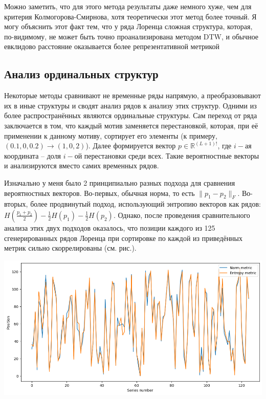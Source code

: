 \documentclass[a4paper, 12pt]{extarticle}
\begin{document}
Можно заметить, что для этого метода результаты даже немного хуже, чем для критерия Колмогорова-Смирнова, хотя теоретически этот метод более точный. Я могу объяснить этот факт тем, что у ряда Лоренца сложная структура, которая, по-видимому, не может быть точно проанализирована методом DTW, и обычное евклидово расстояние оказывается более репрезентативной метрикой

\subsection{Анализ ординальных структур}

Некоторые методы сравнивают не временные ряды напрямую, а преобразовывают их в иные структуры и сводят анализ рядов к анализу этих структур. Одними из более распространённых являются ординальные структуры. Сам переход от ряда заключается в том, что каждый мотив заменяется перестановкой, которая, при её применении к данному мотиву, сортирует его элементы (к примеру, $(0.1,0,0.2)\rightarrow (1,0,2)$). Далее формируется вектор $p\in\mathbb{R}^{(L+1)!}$, где $i-$ая координата – доля $i-$ой перестановки среди всех. Такие вероятностные векторы и анализируются вместо самих временных рядов.

Изначально у меня было 2 принципиально разных подхода для сравнения вероятностных векторов. Во-первых, обычная норма, то есть $\|p_1-p_2\|_F$. Во-вторых, более продвинутый подход, использующий энтропию векторов как рядов: $H\left(\frac{p_1+p_2}{2}\right)-\frac{1}{2}H(p_1)-\frac{1}{2}H(p_2)$. Однако, после проведения сравнительного анализа этих двух подходов оказалось, что позиции каждого из 125 сгенерированных рядов Лоренца при сортировке по каждой из приведённых метрик сильно скоррелированы (см. рис.).

\begin{center}
    \includegraphics[width=\textwidth]{img/metrics.png}
\end{center}
\end{document}
